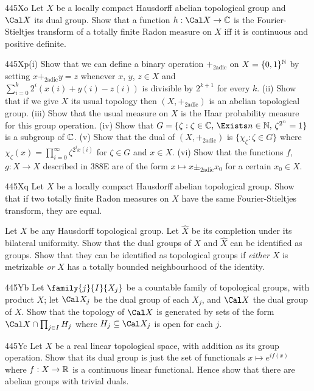 {\spheader 445Xo Let $X$ be a locally compact Hausdorff abelian
topological group and $\Cal X$ its dual group.   Show that a function
$h:\Cal X\to\Bbb C$ is the Fourier-Stieltjes transform of a totally
finite Radon measure on $X$ iff it is continuous and positive definite.

\def\pltwadic{+_{\text{2adic}}}

\spheader 445Xp(i) Show that we can define a binary operation
$\pltwadic$ on $X=\{0,1\}^{\Bbb N}$ by setting $x\pltwadic y=z$ whenever
$x$, $y$, $z\in X$ and $\sum_{i=0}^k2^i(x(i)+y(i)-z(i))$ is divisible by
$2^{k+1}$ for every $k$.   (ii) Show that if we give $X$ its usual
topology then $(X,\pltwadic)$ is an abelian topological group.  (iii)
Show that the usual measure on $X$ is the Haar probability measure for
this group operation.   (iv) Show that
$G=\{\zeta:\zeta\in\Bbb C,\,\Exists n\in\Bbb N,\,\zeta^{2^n}=1\}$ is a
subgroup of $\Bbb C$.   (v) Show that the dual of $(X,\pltwadic)$ is
$\{\chi_{\zeta}:\zeta\in G\}$ where
$\chi_{\zeta}(x)=\prod_{i=0}^{\infty}\zeta^{2^ix(i)}$ for $\zeta\in G$
and $x\in X$.   (vi) Show that the functions $f$, $g:X\to X$ described
in 388E are of the form $x\mapsto x\pm_{\text{2adic}}x_0$ for a certain
$x_0\in X$.

\spheader 445Xq Let $X$ be a locally compact Hausdorff abelian topological
group.   Show that if two totally finite Radon measures on
$X$ have the same Fourier-Stieltjes transform, they are equal.  

Let $X$ be any Hausdorff topological group.   Let $\widehat{X}$ be its
completion under its bilateral uniformity.   Show that the dual
groups of $X$ and $\widehat{X}$ can be identified as groups.   Show that
they can be identified as topological groups if {\it either} $X$ is
metrizable {\it or} $X$ has a totally bounded neighbourhood of the
identity.

\spheader 445Yb Let $\family{j}{I}{X_j}$ be a countable family of
topological groups, with product $X$;  let $\Cal X_j$ be the dual group
of each $X_j$, and $\Cal X$ the dual group of $X$.   Show that the
topology of $\Cal X$ is generated by sets of the form $\Cal
X\cap\prod_{j\in I}H_j$
where $H_j\subseteq\Cal X_j$ is open for each $j$.

\spheader 445Yc Let $X$ be a real linear topological space, with
addition as its group operation.   Show that its dual group is just the
set of functionals $x\mapsto e^{if(x)}$ where $f:X\to\Bbb R$ is a
continuous linear functional.   Hence show that there are abelian groups
with trivial duals.

}

